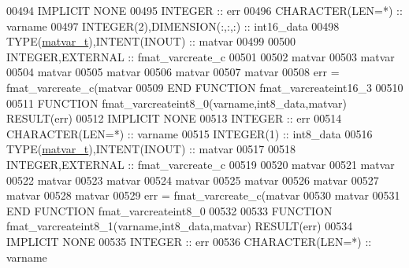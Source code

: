 \begin{DoxyCode}
00494 \textcolor{keywordtype}{IMPLICIT NONE}
00495     \textcolor{keywordtype}{INTEGER}                         :: err
00496     \textcolor{keywordtype}{CHARACTER(LEN=*)}                :: varname
00497     \textcolor{keywordtype}{INTEGER(2)},\textcolor{keywordtype}{DIMENSION(:,:,:)} :: int16\_data
00498     \textcolor{keywordtype}{TYPE}(\hyperlink{group___m_a_t_structmatvar__t}{matvar\_t}),\textcolor{keywordtype}{INTENT(INOUT)}    :: matvar
00499 
00500     \textcolor{keywordtype}{INTEGER},\textcolor{keywordtype}{EXTERNAL}                :: fmat\_varcreate\_c
00501 
00502     matvar%
00503     matvar%
00504     matvar%
00505     matvar%
00506     matvar%
00507     matvar%
00508     err = fmat\_varcreate\_c(matvar%
00509 \textcolor{keyword}{END FUNCTION }fmat\_varcreateint16\_3
00510 
00511 \textcolor{keyword}{FUNCTION }fmat\_varcreateint8\_0(varname,int8\_data,matvar) \textcolor{keyword}{RESULT}(err)
00512 \textcolor{keywordtype}{IMPLICIT NONE}
00513     \textcolor{keywordtype}{INTEGER}                         :: err
00514     \textcolor{keywordtype}{CHARACTER(LEN=*)}                :: varname
00515     \textcolor{keywordtype}{INTEGER(1)}                      :: int8\_data
00516     \textcolor{keywordtype}{TYPE}(\hyperlink{group___m_a_t_structmatvar__t}{matvar\_t}),\textcolor{keywordtype}{INTENT(INOUT)}    :: matvar
00517 
00518     \textcolor{keywordtype}{INTEGER},\textcolor{keywordtype}{EXTERNAL}                :: fmat\_varcreate\_c
00519 
00520     matvar%
00521     matvar%
00522     matvar%
00523     matvar%
00524     matvar%
00525     matvar%
00526     matvar%
00527     matvar%
00528     matvar%
00529     err = fmat\_varcreate\_c(matvar%
00530                            matvar%
00531 \textcolor{keyword}{END FUNCTION }fmat\_varcreateint8\_0
00532 
00533 \textcolor{keyword}{FUNCTION }fmat\_varcreateint8\_1(varname,int8\_data,matvar) \textcolor{keyword}{RESULT}(err)
00534 \textcolor{keywordtype}{IMPLICIT NONE}
00535     \textcolor{keywordtype}{INTEGER}                         :: err
00536     \textcolor{keywordtype}{CHARACTER(LEN=*)}                :: varname

\end{DoxyCode}

